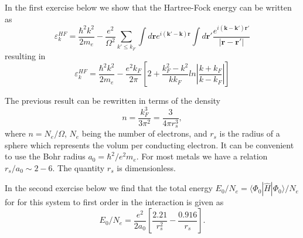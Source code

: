 \documentclass[%
oneside,                 %
final,                   %
10pt]{article}
\begin{document}
In the first exercise below we show that the Hartree-Fock energy can be written as 
\[
\varepsilon_{k}^{HF}=\frac{\hbar^{2}k^{2}}{2m_e}-\frac{e^{2}}
{\Omega^{2}}\sum_{k'\leq
k_{F}}\int d\mathbf{r}e^{i(\mathbf{k}'-\mathbf{k})\mathbf{r}}\int
d\mathbf{r'}\frac{e^{i(\mathbf{k}-\mathbf{k}')\mathbf{r}'}}
{\vert\mathbf{r}-\mathbf{r}'\vert}
\]
resulting in
\[
\varepsilon_{k}^{HF}=\frac{\hbar^{2}k^{2}}{2m_e}-\frac{e^{2}
k_{F}}{2\pi}
\left[
2+\frac{k_{F}^{2}-k^{2}}{kk_{F}}ln\left\vert\frac{k+k_{F}}
{k-k_{F}}\right\vert
\right]
\]



The previous result can be rewritten in terms of the density
\[
n= \frac{k_F^3}{3\pi^2}=\frac{3}{4\pi r_s^3},
\]
where $n=N_e/\Omega$, $N_e$ being the number of electrons, and $r_s$ is the radius of a sphere which represents the volum per conducting electron.  
It can be convenient to use the Bohr radius $a_0=\hbar^2/e^2m_e$.
For most metals we have a relation $r_s/a_0\sim 2-6$.  The quantity $r_s$ is dimensionless.


In the second exercise below  we find that
the total energy
$E_0/N_e=\langle\Phi_{0}|\hat{H}|\Phi_{0}\rangle/N_e$ for
for this system to first order in the interaction is given as 
\[
E_0/N_e=\frac{e^2}{2a_0}\left[\frac{2.21}{r_s^2}-\frac{0.916}{r_s}\right].
\]
\end{document}
